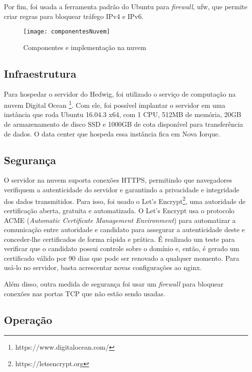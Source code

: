 Por fim, foi usada a ferramenta padrão do Ubuntu para \emph{firewall}, ufw, que permite criar regras para bloquear tráfego IPv4 e IPv6.

\begin{figure}[H]
	\centering
	\caption{Componentes e implementação na nuvem}
  \texttt{[image: componentesNuvem]}
\label{fig:componentesNuvem}
\end{figure}

\subsection{Infraestrutura}

Para hospedar o servidor do Hedwig, foi utilizado o serviço de computação na nuvem Digital Ocean \footnote{https://www.digitalocean.com/}. Com ele, foi possível implantar o servidor em uma instância que roda Ubuntu 16.04.3 x64, com 1 CPU, 512MB de memória, 20GB de armazenamento de disco SSD e 1000GB de cota disponível para transferência de dados. O data center que hospeda essa instância fica em Nova Iorque.

\subsection{Segurança}

O servidor na nuvem suporta conexões HTTPS, permitindo que navegadores verifiquem a autenticidade do servidor e garantindo a privacidade e integridade dos dados transmitidos. Para isso, foi usado o Let's Encrypt\footnote{https://letsencrypt.org}, uma autoridade de certificação aberta, gratuita e automatizada. O Let's Encrypt usa o protocolo ACME (\emph{Automatic Certificate Management Environment}) para automatizar a comunicação entre autoridade e candidato para assegurar a autenticidade deste e conceder-lhe certificados de forma rápida e prática. É realizado um teste para verificar que o candidato possui controle sobre o domínio e, então, é gerado um certificado válido por 90 dias que pode ser renovado a qualquer momento. Para usá-lo no servidor, basta acrescentar novas configurações ao nginx.

Além disso, outra medida de segurança foi usar um \emph{firewall} para bloquear conexões nas portas TCP que não estão sendo usadas.

\subsection{Operação}

